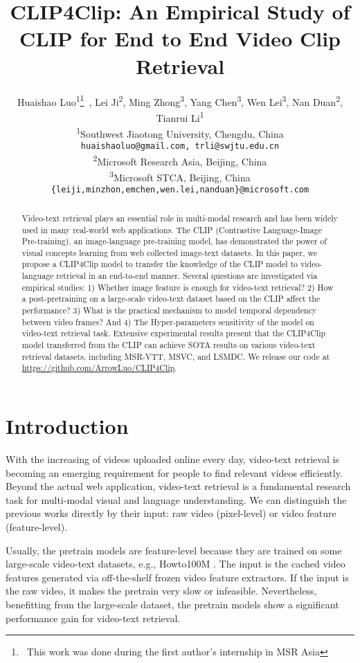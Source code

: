 \documentclass[11pt]{article}
\title{CLIP4Clip: An Empirical Study of CLIP for End to End Video Clip Retrieval}
\author{
	Huaishao Luo\textsuperscript{1}\thanks{~This work was done during the first author's internship in MSR Asia}~,
	Lei Ji\textsuperscript{2},
	Ming Zhong\textsuperscript{3},
	Yang Chen\textsuperscript{3},
	Wen Lei\textsuperscript{3},
	Nan Duan\textsuperscript{2},
	Tianrui Li\textsuperscript{1} \\
	\textsuperscript{1}Southwest Jiaotong University, Chengdu, China\\
	{\tt huaishaoluo@gmail.com, trli@swjtu.edu.cn} \\
	\textsuperscript{2}Microsoft Research Asia, Beijing, China \\ 
	\textsuperscript{3}Microsoft STCA, Beijing, China \\ 
	{\tt \{leiji,minzhon,emchen,wen.lei,nanduan\}@microsoft.com}
}
\begin{document}
	\maketitle
	\begin{abstract}
		Video-text retrieval plays an essential role in multi-modal research and has been widely used in many real-world web applications.  The CLIP (Contrastive Language-Image Pre-training), an image-language pre-training model, has demonstrated the power of visual concepts learning from web collected image-text datasets. In this paper, we propose a CLIP4Clip model to transfer the knowledge of the CLIP model to video-language retrieval in an end-to-end manner. Several questions are investigated via empirical studies: 1) Whether image feature is enough for video-text retrieval? 2) How a post-pretraining on a large-scale video-text dataset based on the CLIP affect the performance? 3) What is the practical mechanism to model temporal dependency between video frames? And 4) The Hyper-parameters sensitivity of the model on video-text retrieval task. Extensive experimental results present that the CLIP4Clip model transferred from the CLIP can achieve SOTA results on various video-text retrieval datasets, including MSR-VTT, MSVC, and LSMDC. We release our code at \url{https://github.com/ArrowLuo/CLIP4Clip}.
	\end{abstract}

	\section{Introduction}
	With the increasing of videos uploaded online every day, video-text retrieval is becoming an emerging requirement for people to find relevant videos efficiently. Beyond the actual web application, video-text retrieval is a fundamental research task for multi-modal visual and language understanding. We can distinguish the previous works directly by their input: raw video (pixel-level) or video feature (feature-level).

	Usually, the pretrain models \cite{Zhu_2020_CVPR,Luo2020UniVL,Li2020HERO,Gabeur2020MMT,patrick2021supportset,Rouditchenko2020} are feature-level because they are trained on some large-scale video-text datasets, e.g., Howto100M \cite{miech2019howto100m}. The input is the cached video features generated via off-the-shelf frozen video feature extractors. If the input is the raw video, it makes the pretrain very slow or infeasible. Nevertheless, benefitting from the large-scale dataset, the pretrain models show a significant performance gain for video-text retrieval.
\end{document}
